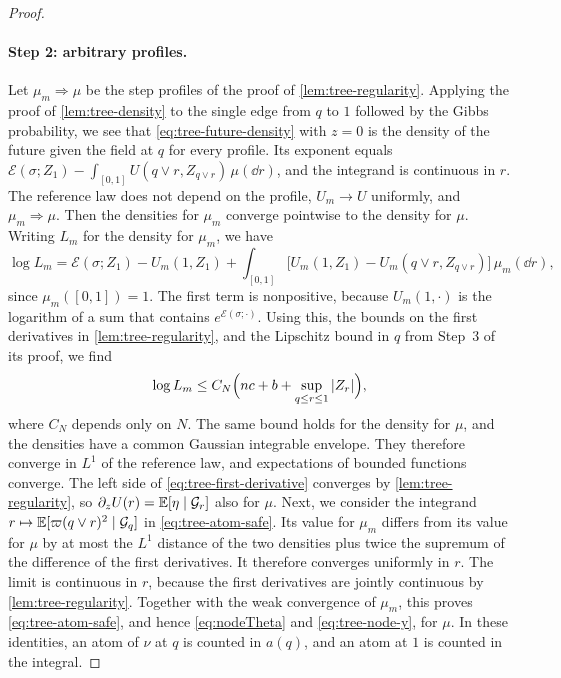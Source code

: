 \begin{proof}
\paragraph{Step 2: arbitrary profiles.}
Let $\mu_m\Rightarrow\mu$ be the step profiles of the proof of
\cref{lem:tree-regularity}. Applying the proof of \cref{lem:tree-density} to
the single edge from $q$ to $1$ followed by the Gibbs probability, we see
that \eqref{eq:tree-future-density} with
$z=0$ is the density of the future given the field at $q$ for every
profile. Its exponent equals
$\mathcal E(\sigma;Z_1)-\int_{[0,1]}U(q\vee r,Z_{q\vee r})\,\mu(\dd r)$,
and the integrand is continuous in $r$. The reference law does not depend
on the profile, $U_m\to U$ uniformly, and $\mu_m\Rightarrow\mu$. Then
the densities for $\mu_m$ converge pointwise to the density for $\mu$.
Writing $L_m$ for the density for $\mu_m$, we have
\[
 \log L_m=\mathcal E(\sigma;Z_1)-U_m(1,Z_1)
   +\int_{[0,1]}\bigl[U_m(1,Z_1)-U_m(q\vee r,Z_{q\vee r})\bigr]\,
   \mu_m(\dd r),
\]
since $\mu_m([0,1])=1$. The first term is nonpositive, because
$U_m(1,\cdot)$ is the logarithm of a sum that contains
$e^{\mathcal E(\sigma;\cdot)}$. Using this, the bounds on the first derivatives in
\cref{lem:tree-regularity}, and the Lipschitz bound in $q$ from Step~3 of
its proof, we find
\[
 \log L_m\le C_N\Bigl(nc+b+\sup_{q\le r\le1}|Z_r|\Bigr),
\]
where $C_N$ depends only on $N$. The same bound holds for the density for
$\mu$, and the densities have a common Gaussian integrable envelope. They
therefore converge in $L^1$ of the reference law, and expectations of
bounded functions converge. The left side of \eqref{eq:tree-first-derivative} converges by
\cref{lem:tree-regularity}, so $\partial_zU(r)=\mathbb E[\eta\mid\mathcal G_r]$ also
for $\mu$. Next, we consider the integrand
$r\mapsto\mathbb E[\varpi(q\vee r)^2\mid\mathcal G_q]$ in \eqref{eq:tree-atom-safe}.
Its value for $\mu_m$ differs from its value for $\mu$ by at most the
$L^1$ distance of the two densities plus twice the supremum of the
difference of the first derivatives. It therefore converges uniformly
in $r$.
The limit is continuous in $r$, because the first derivatives are
jointly continuous by \cref{lem:tree-regularity}. Together with the weak
convergence of $\mu_m$, this proves \eqref{eq:tree-atom-safe}, and hence
\eqref{eq:nodeTheta} and \eqref{eq:tree-node-y}, for $\mu$. In these
identities, an atom of $\nu$ at $q$ is counted in $a(q)$, and an atom at
$1$ is counted in the integral.


\end{proof}
